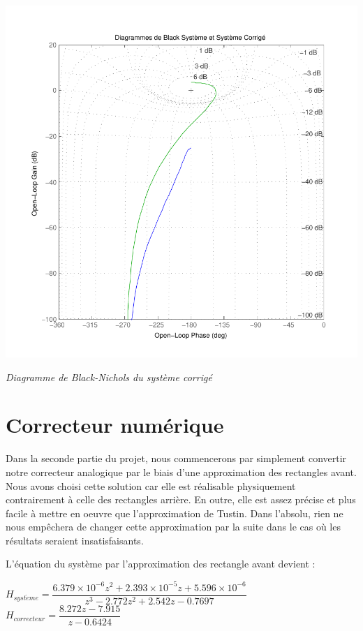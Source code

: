 \documentclass[11pt, french]{article} %
\begin{document}
\begin{center}
\includegraphics[scale=1]{MatBlackFredValues.pdf}

\emph{Diagramme de Black-Nichols du système corrigé}
\end{center}

\section{Correcteur numérique}

Dans la seconde partie du projet, nous commencerons par simplement convertir notre correcteur analogique par le biais d'une approximation des rectangles avant. Nous avons choisi cette solution car elle est réalisable physiquement contrairement à celle des rectangles arrière. En outre, elle est assez précise et plus facile à mettre en oeuvre que l'approximation de Tustin. Dans l'absolu, rien ne nous empêchera de changer cette approximation par la suite dans le cas où les résultats seraient insatisfaisants. 

L'équation du système par l'approximation des rectangle avant devient :
\medskip


\begin{footnotesize}
\begin{center}
$ H_{syst\grave{e}me} = \dfrac{6.379 \times 10^{-6}z^{2} + 2.393 \times 10^{-5}z + 5.596 \times 10^{-6}} {z^{3} - 2.772z^{2} + 2.542z - 0.7697} $
\hspace{2cm}
$  H_{correcteur} = \dfrac {8.272z - 7.915} {z - 0.6424} $
\end{center}
\end{footnotesize}
\end{document}
